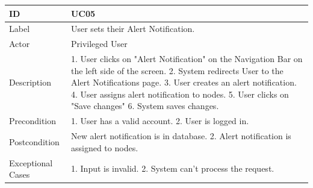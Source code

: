 \documentclass{scrreprt}
\begin{document}
\begin{tabularx}{12cm}{l|X}
	ID & UC05  \\
	\hline
	Label & 
	User sets their Alert Notification. \\
	\hline
	Actor            & Privileged User  \\
	\hline
	Description            &  	1. User clicks on "Alert Notification" on the Navigation Bar on the left side of the screen. 2. System redirects User to the Alert Notifications page. 3. User creates an alert notification. 4. User assigns alert notification to nodes. 5. User clicks on "Save changes" 6. System saves changes.   
	\\
	\hline
	Precondition           & 1. User has a valid account. 2. User is logged in.   \\
	\hline
	Postcondition     &  New alert notification is in database. 2. Alert notification is assigned to nodes. \\
	\hline
	Exceptional Cases & 1. Input is invalid. 2. System can't process the request.
	
\end{tabularx}
\\
\\ \\ 
\end{document}
